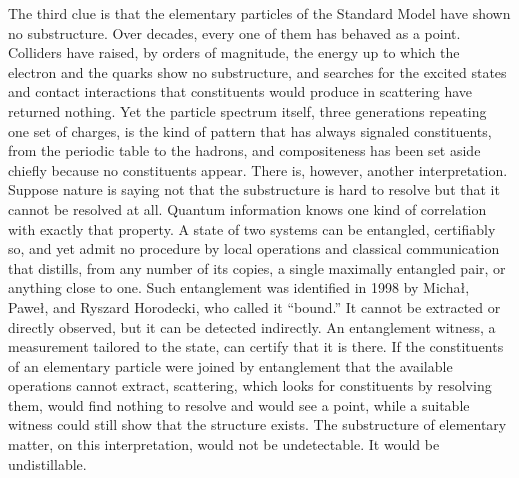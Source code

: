 The third clue is that the elementary particles of the Standard Model have shown no substructure. Over decades, every one of them has behaved as a point. Colliders have raised, by orders of magnitude, the energy up to which the electron and the quarks show no substructure, and searches for the excited states and contact interactions that constituents would produce in scattering have returned nothing. Yet the particle spectrum itself, three generations repeating one set of charges, is the kind of pattern that has always signaled constituents, from the periodic table to the hadrons, and compositeness has been set aside chiefly because no constituents appear. There is, however, another interpretation. Suppose nature is saying not that the substructure is hard to resolve but that it cannot be resolved at all. Quantum information knows one kind of correlation with exactly that property. A state of two systems can be entangled, certifiably so, and yet admit no procedure by local operations and classical communication that distills, from any number of its copies, a single maximally entangled pair, or anything close to one. Such entanglement was identified in 1998 by Micha{\l}, Pawe{\l}, and Ryszard Horodecki, who called it ``bound.'' It cannot be extracted or directly observed, but it can be detected indirectly. An entanglement witness, a measurement tailored to the state, can certify that it is there. If the constituents of an elementary particle were joined by entanglement that the available operations cannot extract, scattering, which looks for constituents by resolving them, would find nothing to resolve and would see a point, while a suitable witness could still show that the structure exists. The substructure of elementary matter, on this interpretation, would not be undetectable. It would be undistillable.

